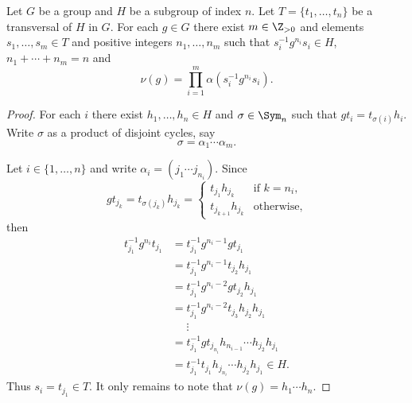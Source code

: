 
\begin{lemma}
	\label{lem:transfer}
	Let $G$ be a group and $H$ be a subgroup of index $n$. Let 
	$T=\{t_1,\dots,t_n\}$ be a transversal of $H$ in $G$.  For each $g\in G$ there exist 
	$m\in\Z_{>0}$ and elements 
	$s_{1},\dots,s_{m}\in T$ and positive integers $n_1,\dots,n_m$
    such that 
	$s_i^{-1}g^{n_i}s_i\in H$,
	$n_1+\cdots+n_m=n$ and 
	\[
		\nu(g)=\prod_{i=1}^m \alpha(s_i^{-1}g^{n_i}s_i).
	\]
\end{lemma}

\begin{proof}
	For each $i$ there exist $h_1,\dots,h_n\in H$ and $\sigma\in\Sym_n$ such that 
	$gt_i=t_{\sigma(i)}h_i$. Write $\sigma$ as a product of disjoint cycles, say 
	\[
		\sigma=\alpha_1\cdots\alpha_m.
	\]

	Let $i\in\{1,\dots,n\}$ and write 
	$\alpha_i=(j_{1}\cdots j_{n_i})$. Since   
	\[
		g t_{j_k}=t_{\sigma(j_k)}h_{j_k}=\begin{cases}
			t_{j_1}h_{j_k} & \text{if $k=n_i$},\\
			t_{j_{k+1}}h_{j_k} & \text{otherwise},
		\end{cases}
	\]
	then 
	\begin{align*}
	t_{j_1}^{-1}g^{n_i}t_{j_1}
	&=t_{j_1}^{-1}g^{n_i-1}gt_{j_1}\\
	&=t_{j_1}^{-1}g^{n_i-1}t_{j_2}h_{j_1}\\
	&=t_{j_1}^{-1}g^{n_i-2}gt_{j_2}h_{j_1}\\
	&=t_{j_1}^{-1}g^{n_i-2}t_{j_3}h_{j_2}h_{j_1}\\
	&\phantom{=}\vdots\\
	&=t_{j_1}^{-1}gt_{j_{n_i}}h_{n_{i-1}}\cdots h_{j_2}h_{j_1}\\
	&=t_{j_1}^{-1}t_{j_1}h_{j_{n_i}}\cdots h_{j_2}h_{j_1}\in H. 	
	\end{align*}
	Thus $s_i=t_{j_1}\in T$. It only remains to note that $\nu(g)=h_1\cdots h_n$. 
\end{proof}

